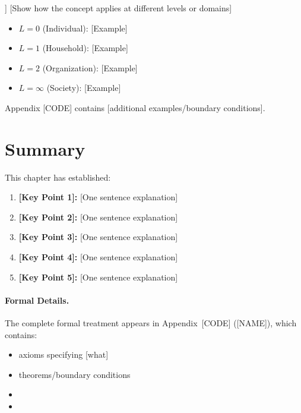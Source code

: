 \begin{intuition}[[Title]]
[Show how the concept applies at different levels or domains]
\begin{itemize}
    \item $L=0$ (Individual): [Example]
    \item $L=1$ (Household): [Example]
    \item $L=2$ (Organization): [Example]
    \item $L=\infty$ (Society): [Example]
\end{itemize}
\end{intuition}

\begin{cross-reference}
Appendix [CODE] contains [additional examples/boundary conditions].
\end{cross-reference}



\section{Summary}
\label{sec:[label]-summary}


This chapter has established:

\begin{enumerate}
    \item \textbf{[Key Point 1]:} [One sentence explanation]

    \item \textbf{[Key Point 2]:} [One sentence explanation]

    \item \textbf{[Key Point 3]:} [One sentence explanation]

    \item \textbf{[Key Point 4]:} [One sentence explanation]

    \item \textbf{[Key Point 5]:} [One sentence explanation]
\end{enumerate}

\paragraph{Formal Details.}
The complete formal treatment appears in Appendix~[CODE] ([NAME]), which contains:
\begin{itemize}
    \item [Number] axioms specifying [what]
    \item [Number] theorems/boundary conditions
    \item [Specific formal content]
    \item [Novel predictions]
\end{itemize}

